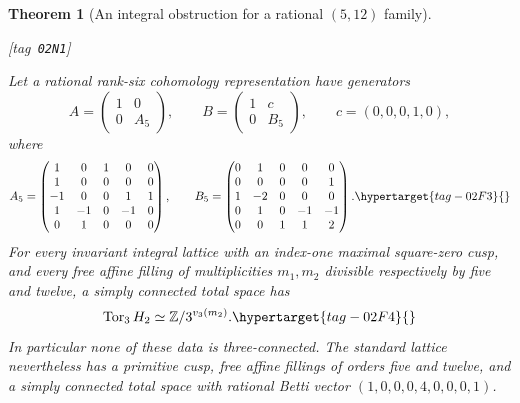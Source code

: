 \documentclass[11pt,a4paper]{article}
\numberwithin{equation}{section}
\newtheorem{theorem}{Theorem}[section]
\theoremstyle{definition}
\newcommand{\StatementRecord}[4]{{\upshape\footnotesize[tag~\texttt{#3}]}\enspace\ignorespaces}
\begin{document}
\begin{theorem}[An integral obstruction for a rational $(5,12)$ family]\hypertarget{tag-02N1}{}\label{maps:src:F.2.12}
\StatementRecord{maps:src:F.2.12}{proved}{02N1}{\eqref{maps:eq:F.33}, \cref{maps:src:F.2.1}, \cref{maps:src:F.2.7}, \cref{night:P1.11}}


Let a rational rank-six cohomology representation have generators
\[
 A=\begin{pmatrix}1&0\\0&A_5\end{pmatrix},\qquad
 B=\begin{pmatrix}1&c\\0&B_5\end{pmatrix},\qquad
 c=(0,0,0,1,0),
\]
where
\begin{equation}
 A_5=\begin{pmatrix}
 1&0&1&0&0\\1&0&0&0&0\\-1&0&0&1&1\\
 1&-1&0&-1&0\\0&1&0&0&0
 \end{pmatrix},\qquad
 B_5=\begin{pmatrix}
 0&1&0&0&0\\0&0&0&0&1\\1&-2&0&0&0\\
 0&1&0&-1&-1\\0&0&1&1&2
 \end{pmatrix}.
 \hypertarget{tag-02F3}{}\label{maps:eq:F.33}
\end{equation}
For every invariant integral lattice with an index-one maximal
square-zero cusp, and every free affine filling of multiplicities
$m_1,m_2$ divisible respectively by five and twelve, a simply
connected total space has
\begin{equation}
 \operatorname{Tor}_3 H_2
       \simeq\mathbb Z/3^{v_3(m_2)}.
 \hypertarget{tag-02F4}{}\label{maps:eq:F.34}
\end{equation}
In particular none of these data is three-connected.
The standard lattice nevertheless has a primitive cusp,
free affine fillings of orders five and twelve, and a simply
connected total space with rational Betti vector
$(1,0,0,0,4,0,0,0,1)$.

\end{theorem}
\end{document}
